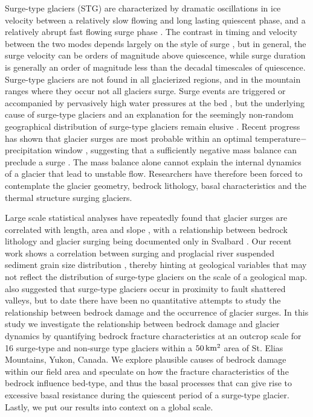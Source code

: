 \documentclass[review]{igs}
\begin{document}
Surge-type glaciers (STG) are characterized by dramatic oscillations in ice velocity between a relatively slow flowing and long lasting quiescent phase, and a relatively abrupt fast flowing surge phase \citep{Meier1969}. The contrast in timing and velocity between the two modes depends largely on the style of surge \citep[e.g.][]{Murray2003}, but in general, the surge velocity can be orders of magnitude above quiescence, while surge duration is generally an order of magnitude less than the decadal timescales of quiescence. Surge-type glaciers are not found in all glacierized regions, and in the mountain ranges where they occur not all glaciers surge. Surge events are triggered or accompanied by pervasively high water pressures at the bed \citep{Kamb1985}, but the underlying cause of surge-type glaciers and an explanation for the seemingly non-random geographical distribution of surge-type glaciers remain elusive \citep{Harrison2003}. Recent progress has shown that glacier surges are most probable within an optimal temperature$\--$precipitation window \citep{Sevestre2015}, suggesting that a sufficiently negative mass balance can preclude a surge \citep[e.g.][]{Dowdeswell1995,Kienholz2016}. The mass balance alone cannot explain the internal dynamics of a glacier that lead to unstable flow. Researchers have therefore been forced to contemplate the glacier geometry, bedrock lithology, basal characteristics and the thermal structure surging glaciers. 

Large scale statistical analyses have repeatedly found that glacier surges are correlated with length, area and slope \citep[e.g.][]{Clarke1986,Hamilton1996,Jiskoot1998,Sevestre2015}, with a relationship between bedrock lithology and glacier surging being documented only in Svalbard \citep[e.g.][]{Hamilton1996,Jiskoot1998}. Our recent work shows  a correlation between surging and proglacial river suspended sediment grain size distribution \citep{Crompton2016}, thereby hinting at geological variables that may not reflect the distribution of surge-type glaciers on the scale of a geological map. \cite{Post1969} also suggested that surge-type glaciers occur in proximity to fault shattered valleys, but to date there have been no quantitative attempts to study the relationship between bedrock damage and the occurrence of glacier surges. In this study we investigate the relationship between bedrock damage and glacier dynamics by quantifying bedrock fracture characteristics at an outcrop scale for 16 surge-type and non-surge type glaciers within a $\rm 50\,km^2$ area of St. Elias Mountains, Yukon, Canada. We explore plausible causes of bedrock damage within our field area and speculate on how the fracture characteristics of the bedrock influence bed-type, and thus the basal processes that can give rise to excessive basal resistance during the quiescent period of a surge-type glacier. Lastly, we put our results into context on a global scale.  
\end{document}
